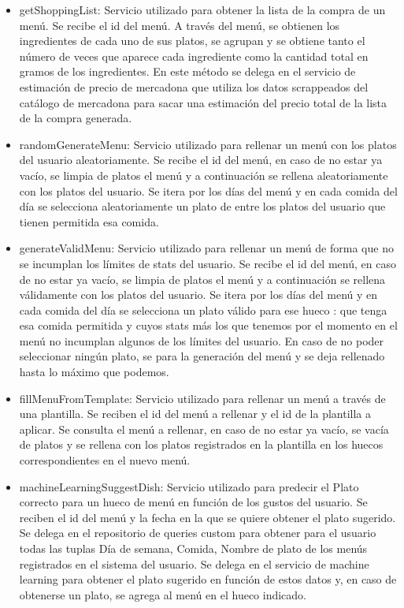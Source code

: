 \documentclass[12pt, a4paper, twoside]{book}
\begin{document}
\begin{itemize}
\begin{itemize}
			\item getShoppingList: Servicio utilizado para obtener la lista de la compra de un menú. Se recibe el id del menú. A través del menú, se obtienen los ingredientes de cada uno de sus platos, se agrupan y se obtiene tanto el número de veces que aparece cada ingrediente como la cantidad total en gramos de los ingredientes. En este método se delega en el servicio de estimación de precio de mercadona que utiliza los datos scrappeados del catálogo de mercadona para sacar una estimación del precio total de la lista de la compra generada.
			\item randomGenerateMenu: Servicio utilizado para rellenar un menú con los platos del usuario aleatoriamente. Se recibe el id del menú, en caso de no estar ya vacío, se limpia de platos el menú y a continuación se rellena aleatoriamente con los platos del usuario. Se itera por los días del menú y en cada comida del día se selecciona aleatoriamente un plato de entre los platos del usuario que tienen permitida esa comida.
			\item generateValidMenu: Servicio utilizado para rellenar un menú de forma que no se incumplan los límites de stats del usuario. Se recibe el id del menú, en caso de no estar ya vacío, se limpia de platos el menú y a continuación se rellena válidamente con los platos del usuario. Se itera por los días del menú y en cada comida del día se selecciona un plato válido para ese hueco : que tenga esa comida permitida y cuyos stats más los que tenemos por el momento en el menú no incumplan algunos de los límites del usuario. En caso de no poder seleccionar ningún plato, se para la generación del menú y se deja rellenado hasta lo máximo que podemos.
			\item fillMenuFromTemplate: Servicio utilizado para rellenar un menú a través de una plantilla. Se reciben el id del menú a rellenar y el id de la plantilla a aplicar. Se consulta el menú a rellenar, en caso de no estar ya vacío, se vacía de platos y se rellena con los platos registrados en la plantilla en los huecos correspondientes en el nuevo menú.
			\item machineLearningSuggestDish: Servicio utilizado para predecir el Plato correcto para un hueco de menú en función de los gustos del usuario. Se reciben el id del menú y la fecha en la que se quiere obtener el plato sugerido. Se delega en el repositorio de queries custom para obtener para el usuario todas las tuplas {Día de semana, Comida, Nombre de plato} de los menús registrados en el sistema del usuario. Se delega en el servicio de machine learning para obtener el plato sugerido en función de estos datos y, en caso de obtenerse un plato, se agrega al menú en el hueco indicado.

\end{itemize}
\end{itemize}
\end{document}

